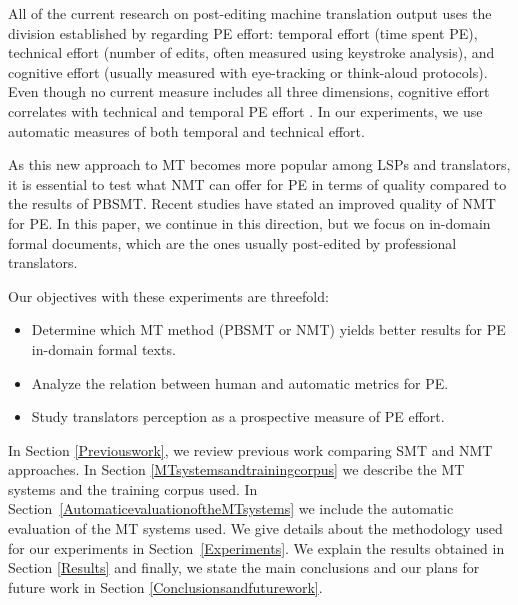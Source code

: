 \documentclass[output=paper]{langsci/langscibook}
\begin{document}
All of the current research on post-editing machine translation output uses the division established by \citet{krings2001repairing} regarding PE effort:  temporal effort (time spent PE), technical effort (number of edits, often measured using keystroke analysis), and cognitive effort (usually measured with eye-tracking or think-aloud protocols). Even though no current measure includes all three dimensions, cognitive effort correlates with technical and temporal PE effort \citep{moorkens_correlations_2015}. In our experiments, we use automatic measures of both temporal and technical effort.

As this new approach to MT becomes more popular among LSPs and translators, it is essential to test what NMT can offer for PE in terms of quality compared to the results of PBSMT. Recent studies \citep{Bentivogli2016,Castillo2017,Toral2017} have stated an improved quality of NMT for PE. In this paper, we continue in this direction, but we focus on in-domain formal documents, which are the ones usually post-edited by professional translators. 


Our objectives with these experiments are threefold:
\begin{itemize}
\item Determine which MT method (PBSMT or NMT) yields better results for PE in-domain formal texts.
\item Analyze the relation between human and automatic metrics for PE.
\item Study translators perception as a prospective measure of PE effort.
\end{itemize}

In Section \ref{Previouswork}, we review previous work comparing SMT and NMT approaches. In Section \ref{MTsystemsandtrainingcorpus} we describe the MT systems and the training corpus used. In Section~\ref{AutomaticevaluationoftheMTsystems} we include the automatic evaluation of the MT systems used. We give details about the methodology used for our experiments in Section~\ref{Experiments}. We explain the results obtained in Section \ref{Results} and finally, we state the main conclusions and our plans for future work in Section \ref{Conclusionsandfuturework}.
\end{document}

